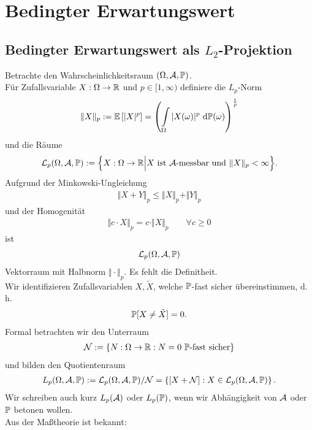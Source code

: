 
\chapter{Bedingter Erwartungswert}
\section{Bedingter Erwartungswert als \texorpdfstring{$L_2$}{L\_2}-Projektion}
Betrachte den Wahrscheinlichkeitsraum $(\Omega,\A,\P)$.\\
Für Zufallsvariable $X:\Omega\to\R$ und $p\in[1,\infty)$ definiere die $L_p$-Norm
\begin{align*}
\Vert X\Vert_p:=\E\left[|X|^p\right]=\left(\int\limits_\Omega|X(\omega)|^p\d\P(\omega)\right)^{\frac{1}{p}}
\end{align*}
und die Räume
\begin{align*}
\mathcal{L}_p(\Omega,\A,\P):=\Big\lbrace X:\Omega\to\R\Big|X\text{ ist $\A$-messbar und }\Vert X\Vert_p<\infty\Big\rbrace.
\end{align*}
Aufgrund der Minkowski-Ungleichung
\begin{align*}
\Vert X+Y\Vert_p\leq\Vert X\Vert_p+\Vert Y\Vert_p
\end{align*}
und der Homogenität
\begin{align*}
\Vert c\cdot X\Vert_p=c\cdot\Vert X\Vert_p\qquad\forall c\geq0
\end{align*}
ist 
\begin{align*}
\mathcal{L}_p(\Omega,\A,\P)
\end{align*}
Vektorraum mit Halbnorm $\Vert\cdot\Vert_p$. Es fehlt die Definitheit.\\
Wir identifizieren Zufallsvariablen $X,\tilde{X}$, welche $\P$-fast sicher übereinstimmen, d. h. 
\begin{align*}
\P[X\neq\tilde{X}]=0.
\end{align*}
Formal betrachten wir den Unterraum
\begin{align*}
\mathcal{N}:=\lbrace N:\Omega\to\R:N=0\text{ $\P$-fast sicher}\rbrace
\end{align*}
und bilden den Quotientenraum
\begin{align*}
L_p(\Omega,\A,\P):=\mathcal{L}_p(\Omega,\A,\P)/\mathcal{N}=\left\lbrace[X+\mathcal{N}]:X\in\mathcal{L}_p(\Omega,\A,\P)\right\rbrace.
\end{align*}
Wir schreiben auch kurz $L_p(\A)$ oder $L_p(\P)$, wenn wir Abhängigkeit von $\A$ oder $\P$ betonen wollen.\\
Aus der Maßtheorie ist bekannt:

